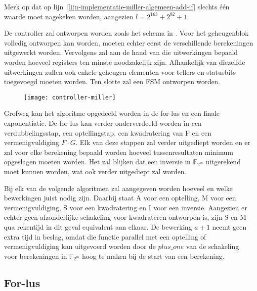 Merk op dat op lijn~\ref{lijn-implementatie-miller-algemeen-add-if} slechts \'e\'en waarde moet nagekeken worden, aangezien $l = 2^{163} + 2^{82} + 1$.

De controller zal ontworpen worden zoals het schema in . Voor het geheugenblok volledig ontworpen kan worden, moeten echter eerst de verschillende berekeningen uitgewerkt worden. Vervolgens zal aan de hand van die uitwerkingen bepaald worden hoeveel registers ten minste noodzakelijk zijn. Afhankelijk van diezelfde uitwerkingen zullen ook enkele geheugen elementen voor tellers en statusbits toegevoegd moeten worden. Ten slotte zal een FSM ontworpen worden.

\begin{figure}[h]
	\centering
		\texttt{[image: controller-miller]}
\end{figure}

Grofweg kan het algoritme opgedeeld worden in de for-lus  en een finale exponentiatie. De for-lus kan verder onderverdeeld worden in een verdubbelingsstap, een optellingstap, een kwadratering van F en een vermenigvuldiging $F \cdot G$. Elk van deze stappen zal verder uitgediept worden en er zal voor elke berekening bepaald worden hoeveel tussenresultaten minimum opgeslagen moeten worden. Het zal blijken dat een inversie in $\mathbb{F}_{2^m}$ uitgerekend moet kunnen worden, wat ook verder uitgediept zal worden.

Bij elk van de volgende algoritmen zal aangegeven worden hoeveel en welke bewerkingen juist nodig zijn. Daarbij staat \textsf{A} voor een optelling, \textsf{M} voor een vermenigvuldiging, \textsf{S} voor een kwadratering en \textsf{I} voor een inversie. Aangezien er echter geen afzonderlijke schakeling voor kwadrateren ontworpen is, zijn \textsf{S} en \textsf{M} qua rekentijd in dit geval equivalent aan elkaar. De bewerking $a + 1$ neemt geen extra tijd in beslag, omdat die functie parallel met een optelling of vermenigvuldiging kan uitgevoerd worden door de $plus\_one$ van de schakeling voor berekeningen in $\mathbb{F}_{2^m}$ hoog te maken bij de start van een berekening.

\subsection{For-lus\label{subsectie-implementatie-miller-forlus}}

